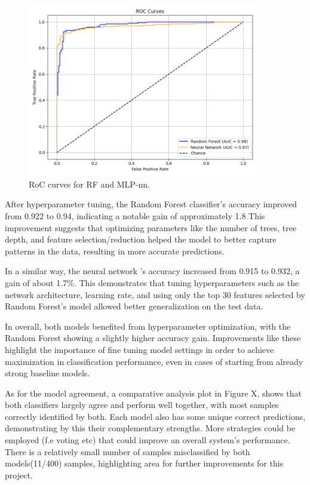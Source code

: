 \documentclass[11pt,a4paper]{article}
\begin{document}
		\begin{figure}[H]
			\centering
			\includegraphics[width=0.9\textwidth]{images/roc_hyper.png}
			\caption{RoC curves for RF and MLP-nn.}
			\label{fig1:}
		\end{figure}		

	
		After hyperparameter tuning, the Random Forest classifier’s accuracy improved from 0.922 to 0.94, 
		indicating a notable gain of approximately 1.8%
		This improvement suggests that optimizing 
		parameters like the number of trees, tree depth, and feature selection/reduction helped the model to
		better capture patterns in the data, resulting in more accurate predictions.

		In a similar way, the neural network 's accuracy increased from 0.915 to 0.932, 
		a gain of about 1.7\%. 
		This demonstrates that tuning hyperparameters such as the network architecture, 
		learning rate, and using only the top 30 features selected by Random Forest's model
		allowed  better generalization on the test data.

		In overall, both models benefited from hyperparameter optimization, 
		with the Random Forest showing a slightly higher accuracy gain. 
		Improvements like these highlight the importance of fine tuning model settings 
		in order to achieve maximization in classification performance, 
		even in cases of starting from already strong baseline models.
		

		As for the model agreement, a comparative analysis plot in Figure X, 
		shows that both classifiers largely agree and perform well together, 
		with most samples correctly identified by both.
		Each model also has some unique correct predictions, 
		demonstrating by this their complementary strengths.
		More strategies could be employed (f.e voting etc) that could improve an overall
		system's performance.
		There is a relatively small number of samples misclassified by both models(11/400) samples,
		highlighting area for further improvements for this project.
		
\end{document}
